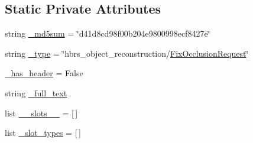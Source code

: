 \subsection*{\-Static \-Private \-Attributes}
\begin{DoxyCompactItemize}
\item 
string \hyperlink{classhbrs__object__reconstruction_1_1srv_1_1___fix_occlusion_1_1_fix_occlusion_request_a6e48a08c47786e8ae432527d68e53da6}{\-\_\-md5sum} = \char`\"{}d41d8cd98f00b204e9800998ecf8427e\char`\"{}
\item 
string \hyperlink{classhbrs__object__reconstruction_1_1srv_1_1___fix_occlusion_1_1_fix_occlusion_request_a995c44577c086cddd5ba215cfd657496}{\-\_\-type} = \char`\"{}hbrs\-\_\-object\-\_\-reconstruction/\hyperlink{classhbrs__object__reconstruction_1_1srv_1_1___fix_occlusion_1_1_fix_occlusion_request}{\-Fix\-Occlusion\-Request}\char`\"{}
\item 
\hyperlink{classhbrs__object__reconstruction_1_1srv_1_1___fix_occlusion_1_1_fix_occlusion_request_adc321b035c7e424bdc35fdf5808da7e9}{\-\_\-has\-\_\-header} = \-False
\item 
string \hyperlink{classhbrs__object__reconstruction_1_1srv_1_1___fix_occlusion_1_1_fix_occlusion_request_ad4da719eaaf0acc9ffbb0eb6bd47fef3}{\-\_\-full\-\_\-text}
\item 
list \hyperlink{classhbrs__object__reconstruction_1_1srv_1_1___fix_occlusion_1_1_fix_occlusion_request_a57231c23a3e06b56abbd4ea5cf93f4c9}{\-\_\-\-\_\-slots\-\_\-\-\_\-} = \mbox{[}$\,$\mbox{]}
\item 
list \hyperlink{classhbrs__object__reconstruction_1_1srv_1_1___fix_occlusion_1_1_fix_occlusion_request_a206df69095ca36bbbbeb723b5e725949}{\-\_\-slot\-\_\-types} = \mbox{[}$\,$\mbox{]}
\end{DoxyCompactItemize}


